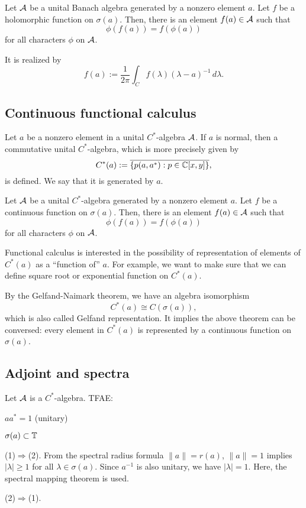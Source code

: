\documentclass{../crs}
\begin{document}
\begin{thm}
Let $\mathcal{A}$ be a unital Banach algebra generated by a nonzero element $a$.
Let $f$ be a holomorphic function on $\sigma(a)$.
Then, there is an element $f(a)\in\mathcal{A}$ such that
\[\phi(f(a))=f(\phi(a))\]
for all characters $\phi$ on $\mathcal{A}$.
\end{thm}
\begin{pf}
It is realized by
\[f(a):=\frac1{2\pi}\int_Cf(\lambda)(\lambda-a)^{-1}\,d\lambda.\]
\end{pf}

\begin{ex}

\end{ex}


\subsection{Continuous functional calculus}
Let $a$ be a nonzero element in a unital $C^*$-algebra $\mathcal{A}$.
If $a$ is normal, then a commutative unital $C^*$-algebra, which is more precisely given by
\[C^*(a):=\overline{\{p(a,a^*):p\in\mathbb{C}[x,y]\}},\]
is defined.
We say that it is generated by $a$.

\begin{thm}
Let $\mathcal{A}$ be a unital $C^*$-algebra generated by a nonzero element $a$.
Let $f$ be a continuous function on $\sigma(a)$.
Then, there is an element $f(a)\in\mathcal{A}$ such that
\[\phi(f(a))=f(\phi(a))\]
for all characters $\phi$ on $\mathcal{A}$.
\end{thm}

Functional calculus is interested in the possibility of representation of elements of $C^*(a)$ as a ``function of'' $a$.
For example, we want to make sure that we can define square root or exponential function on $C^*(a)$.




By the Gelfand-Naimark theorem, we have an algebra isomorphism
\[C^*(a)\cong C(\sigma(a)),\]
which is also called Gelfand representation.
It implies the above theorem can be conversed: every element in $C^*(a)$ is represented by a continuous function on $\sigma(a)$.




\subsection{Adjoint and spectra}
\begin{thm}
Let $\mathcal{A}$ is a $C^*$-algebra.
TFAE:
\begin{cond}
\item $aa^*=1$ (unitary)
\item $\sigma(a)\subset\mathbb{T}$
\end{cond}
\end{thm}
\begin{pf}
(1)$\Rightarrow$(2).
From the spectral radius formula $\|a\|=r(a)$, $\|a\|=1$ implies $|\lambda|\ge1$ for all $\lambda\in\sigma(a)$.
Since $a^{-1}$ is also unitary, we have $|\lambda|=1$.
Here, the spectral mapping theorem is used.

(2)$\Rightarrow$(1).
\end{pf}
\end{document}
